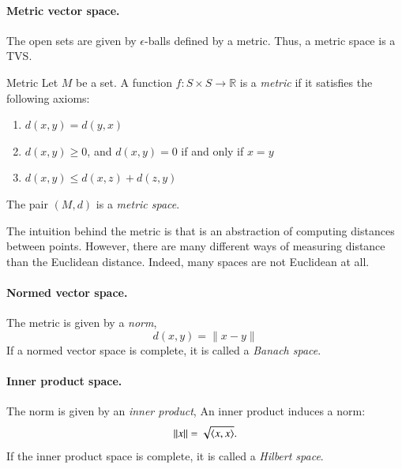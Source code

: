\paragraph{Metric vector space.} The open sets are given by $\epsilon$-balls defined by a metric. Thus, a metric space is a TVS. 

\begin{myDefinition}{Metric}{}
    Let $M$ be a set. A function $f: S\times S \to \mathbb{R}$ is a \emph{metric} if it satisfies the following axioms:
    \begin{enumerate}
        \item $d(x,y) = d(y,x)$ 
        \item $d(x,y) \geq 0$, and $d(x,y) = 0$ if and only if $x =y$ 
        \item $d(x,y) \leq d(x,z) + d(z,y)$ 
    \end{enumerate}
    The pair $(M,d)$ is a \emph{metric space}.
\end{myDefinition}
The intuition behind the metric is that is an abstraction of computing distances between points. However, there are many different ways of measuring distance than the Euclidean distance. Indeed, many spaces are not Euclidean at all.


\paragraph{Normed vector space.} The metric is given by a \emph{norm},
\begin{equation}
    d(x,y) = \|x-y\|
\end{equation}
If a normed vector space is complete, it is called a \emph{Banach space}.



\paragraph{Inner product space.} The norm is given by an \emph{inner product},
An inner product induces a norm:
\begin{equation}
    \|x\| = \sqrt{\braket{x,x}}.
\end{equation} 
If the inner product space is complete, it is called a \emph{Hilbert space}.


